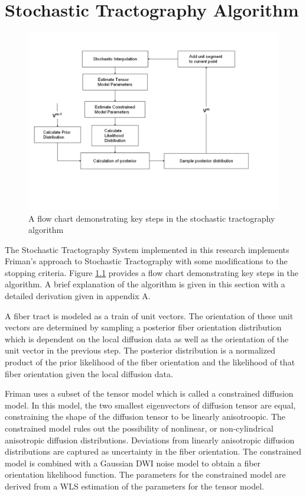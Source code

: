\chapter{Stochastic Tractography Algorithm}
\begin{figure} \label{fig:stflow}
  \center 
	\includegraphics[trim = 10mm 50mm 20mm 30mm, clip, width=\linewidth]{stflow}
	\caption{A flow chart demonstrating key steps in the stochastic tractography algorithm}
\end{figure}
The Stochastic Tractography System implemented in this research implements Friman's \cite{frimanTMI06} approach to Stochastic Tractography with some modifications to the stopping criteria.  Figure \ref{fig:stflow} provides a flow chart demonstrating key steps in the algorithm.  A brief explanation of the algorithm is given in this section with a detailed derivation given in appendix A.

A fiber tract is modeled as a train of unit vectors.  The orientation of these unit vectors are determined by sampling a posterior fiber orientation distribution which is dependent on the local diffusion data as well as the orientation of the unit vector in the previous step.  The posterior distribution is a normalized product of the prior likelihood of the fiber orientation and the likelihood of that fiber orientation given the local diffusion data.

Friman uses a subset of the tensor model which is called a constrained diffusion model.  In this model, the two smallest eigenvectors of diffusion tensor are equal, constraining the shape of the diffusion tensor to be linearly anisotroopic.  The constrained model rules out the possibility of nonlinear, or non-cylindrical anisotropic diffusion distributions.  Deviations from linearly anisotropic diffusion distributions are captured as uncertainty in the fiber orientation.  The constrained model is combined with a Gaussian DWI noise model to obtain a fiber orientation likelihood function.  The parameters for the constrained model are derived from a WLS estimation of the parameters for the tensor model.

